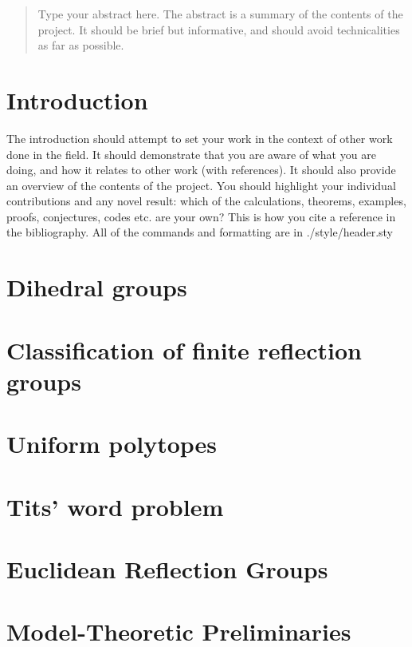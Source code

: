 \documentclass[a4paper,11pt, titlepage]{article}
\begin{document}
\begin{titlepage}

\end{titlepage}

\begin{abstract}
Type your abstract here. The abstract is a summary of the contents of the project. It should be brief but informative, and
should avoid technicalities as far as possible.
\end{abstract}

\tableofcontents
\clearpage

\section{Introduction}
The introduction should attempt to set your work in the context of other work done in the field. It
should demonstrate that you are aware of what you are doing, and how it relates to other work
(with references). It should also provide an overview of the contents of the project. You should
highlight your individual contributions and any novel result: which of the calculations, theorems,
examples, proofs, conjectures, codes etc. are your own? This is how you cite a reference in the bibliography\cite{Humphreys1990}. All of the commands and formatting are in ./style/header.sty

\section{Dihedral groups}


\section{Classification of finite reflection groups}\label{Classification}


\section{Uniform polytopes}


\section{Tits' word problem}


\section{Euclidean Reflection Groups}


\appendix
\section{Model-Theoretic Preliminaries}\label{Model Theory}



\end{document}
